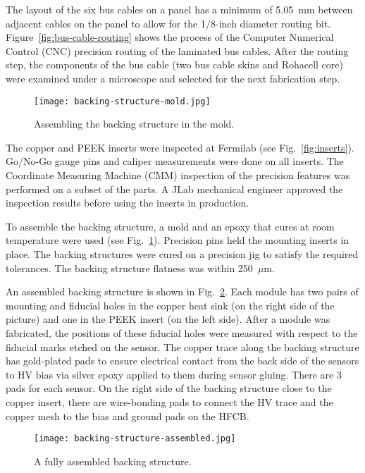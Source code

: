 The layout of the six bus cables on a panel has a minimum of 5.05~mm between adjacent cables on the panel to allow
for the 1/8-inch diameter routing bit. Figure~\ref{fig:bus-cable-routing} shows the process of the Computer
Numerical Control (CNC) precision routing of the laminated bus cables. After the routing step, the components of
the bus cable (two bus cable skins and Rohacell core) were examined under a microscope and selected for the next
fabrication step. 

\begin{figure}[h] 
\centering 
\texttt{[image: backing-structure-mold.jpg]}
\caption{Assembling the backing structure in the mold.}
\label{fig:backing-structure-mold}
\end{figure}

The copper and PEEK inserts were inspected at Fermilab (see Fig.~\ref{fig:inserts}). Go/No-Go gauge pins and
caliper measurements were done on all inserts. The Coordinate Measuring Machine (CMM) inspection of the
precision features was performed on a subset of the parts. A JLab mechanical engineer approved the inspection
results before using the inserts in production.

To assemble the backing structure, a mold and an epoxy that cures at room temperature were used (see
Fig.~\ref{fig:backing-structure-mold}). Precision pins held the mounting inserts in place. The backing structures
were cured on a precision jig to satisfy the required tolerances. The backing structure flatness was within
250~$\mu$m.

An assembled backing structure is shown in Fig.~\ref{fig:backing-structure-assembled}. Each module has two pairs
of mounting and fiducial holes in the copper heat sink (on the right side of the picture) and one in the PEEK insert (on
the left side). After a module was fabricated, the positions of these fiducial holes were measured with respect to
the fiducial marks etched on the sensor. The copper trace along the backing structure has gold-plated pads to
ensure electrical contact from the back side of the sensors to HV bias via silver epoxy applied to them during sensor
gluing. There are 3 pads for each sensor. On the right side of the backing structure close to the copper insert, there
are wire-bonding pads to connect the HV trace and the copper mesh to the bias and ground pads on the HFCB.

\begin{figure}[h] 
\centering 
\texttt{[image: backing-structure-assembled.jpg]}
\caption{A fully assembled backing structure.}
\label{fig:backing-structure-assembled}
\end{figure}

